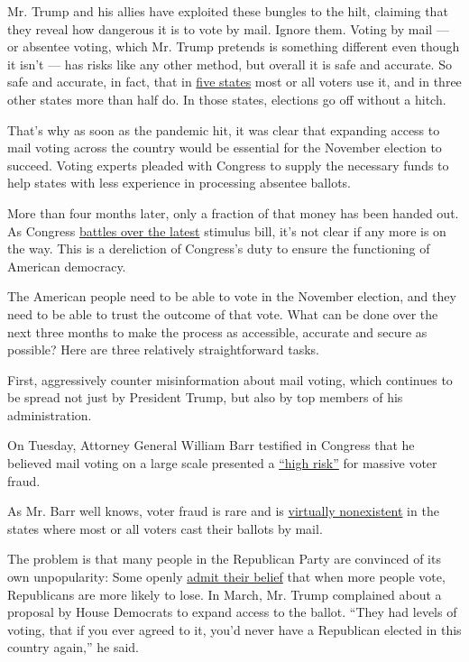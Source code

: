 Mr. Trump and his allies have exploited these bungles to the hilt,
claiming that they reveal how dangerous it is to vote by mail. Ignore
them. Voting by mail --- or absentee voting, which Mr. Trump pretends is
something different even though it isn't --- has risks like any other
method, but overall it is safe and accurate. So safe and accurate, in
fact, that in
\href{https://www.ncsl.org/research/elections-and-campaigns/all-mail-elections.aspx}{five
states} most or all voters use it, and in three other states more than
half do. In those states, elections go off without a hitch.

That's why as soon as the pandemic hit, it was clear that expanding
access to mail voting across the country would be essential for the
November election to succeed. Voting experts pleaded with Congress to
supply the necessary funds to help states with less experience in
processing absentee ballots.

More than four months later, only a fraction of that money has been
handed out. As Congress
\href{https://www.nytimes3xbfgragh.onion/2020/07/30/opinion/mitch-mcconnell-coronavirus-economy.html}{battles
over the latest} stimulus bill, it's not clear if any more is on the
way. This is a dereliction of Congress's duty to ensure the functioning
of American democracy.

The American people need to be able to vote in the November election,
and they need to be able to trust the outcome of that vote. What can be
done over the next three months to make the process as accessible,
accurate and secure as possible? Here are three relatively
straightforward tasks.

First, aggressively counter misinformation about mail voting, which
continues to be spread not just by President Trump, but also by top
members of his administration.

On Tuesday, Attorney General William Barr testified in Congress that he
believed mail voting on a large scale presented a
\href{https://www.washingtonpost.com/video/politics/barr-states-that-mail-in-voting-could-lead-to-a-high-risk-of-fraud/2020/07/28/2db47f91-2c5f-41e3-904e-79072b68547d_video.html}{``high
risk''} for massive voter fraud.

As Mr. Barr well knows, voter fraud is rare and is
\href{https://docs.wixstatic.com/ugd/ef45f5_81a3affd554e4b5b9b5852f8fb3c10fd.pdf}{virtually
nonexistent} in the states where most or all voters cast their ballots
by mail.

The problem is that many people in the Republican Party are convinced of
its own unpopularity: Some openly
\href{https://www.washingtonpost.com/politics/2020/03/30/trump-voting-republicans/}{admit
their belief} that when more people vote, Republicans are more likely to
lose. In March, Mr. Trump complained about a proposal by House Democrats
to expand access to the ballot. ``They had levels of voting, that if you
ever agreed to it, you'd never have a Republican elected in this country
again,'' he said.

